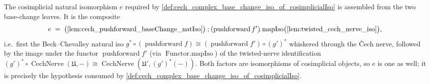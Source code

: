 \begin{definition}

  \label{def:cech_complex_base_change_cosimplicialIso}
  The cosimplicial natural isomorphism \(e\) required by
  \cref{def:cech_complex_base_change_iso_of_cosimplicialIso} is assembled from the two
  base-change leaves. It is the composite
  \[
    e \;=\;
      \bigl(\cref{lem:cech_pushforward_baseChange_natIso}\bigr)
      \mathbin{;}
      (\operatorname{pushforward} f')\!.\operatorname{mapIso}
        \bigl(\cref{lem:twisted_cech_nerve_iso}\bigr),
  \]
  i.e.\ first the Beck--Chevalley natural iso
  \(g^* \circ (\operatorname{pushforward} f) \cong (\operatorname{pushforward} f')
  \circ (g')^*\) whiskered through the {\v C}ech nerve, followed by the image under the
  functor \(\operatorname{pushforward} f'\) (via \(\operatorname{Functor.mapIso}\)) of the
  twisted-nerve identification
  \((g')^* \circ \operatorname{CechNerve}(\mathfrak{U}, -) \cong
  \operatorname{CechNerve}(\mathfrak{U}', (g')^*(-))\). Both factors are isomorphisms of
  cosimplicial objects, so \(e\) is one as well; it is precisely the hypothesis consumed
  by \cref{def:cech_complex_base_change_iso_of_cosimplicialIso}.
\end{definition}

